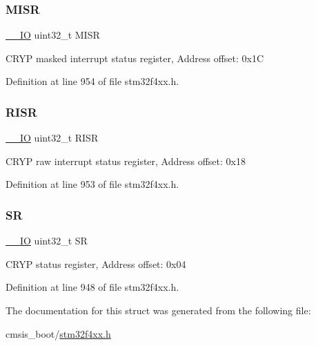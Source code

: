 \subsubsection{\texorpdfstring{M\+I\+SR}{MISR}}
{\footnotesize\ttfamily \hyperlink{group___c_m_s_i_s__core__definitions_gaec43007d9998a0a0e01faede4133d6be}{\+\_\+\+\_\+\+IO} uint32\+\_\+t M\+I\+SR}

C\+R\+YP masked interrupt status register, Address offset\+: 0x1C 

Definition at line 954 of file stm32f4xx.\+h.

\mbox{\label{struct_c_r_y_p___type_def_aa196fddf0ba7d6e3ce29bdb04eb38b94}} 
\subsubsection{\texorpdfstring{R\+I\+SR}{RISR}}
{\footnotesize\ttfamily \hyperlink{group___c_m_s_i_s__core__definitions_gaec43007d9998a0a0e01faede4133d6be}{\+\_\+\+\_\+\+IO} uint32\+\_\+t R\+I\+SR}

C\+R\+YP raw interrupt status register, Address offset\+: 0x18 

Definition at line 953 of file stm32f4xx.\+h.

\mbox{\label{struct_c_r_y_p___type_def_af6aca2bbd40c0fb6df7c3aebe224a360}} 
\subsubsection{\texorpdfstring{SR}{SR}}
{\footnotesize\ttfamily \hyperlink{group___c_m_s_i_s__core__definitions_gaec43007d9998a0a0e01faede4133d6be}{\+\_\+\+\_\+\+IO} uint32\+\_\+t SR}

C\+R\+YP status register, Address offset\+: 0x04 

Definition at line 948 of file stm32f4xx.\+h.



The documentation for this struct was generated from the following file\+:\begin{DoxyCompactItemize}
\item 
cmsis\+\_\+boot/\hyperlink{stm32f4xx_8h}{stm32f4xx.\+h}\end{DoxyCompactItemize}
